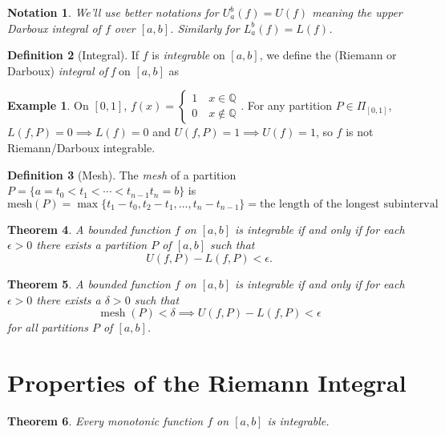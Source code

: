 \documentclass[12pt, lettersize]{book}
\theoremstyle{plain}
\newtheorem{thm}{Theorem}[section]
\newtheorem{nte}[thm]{Notation}
\theoremstyle{definition}
\newtheorem{dfn}[thm]{Definition}
\newtheorem*{eg}{Example}
\theoremstyle{remark}
\newcommand{\Q}{\mathbb{Q}}
\DeclareMathOperator{\mesh}{mesh}
\begin{document}
	\begin{nte}
		We'll use better notations for $U_a^b(f)=U(f)$ meaning the upper Darboux integral of $f$ over $[a,b]$. Similarly for $L_a^b(f)=L(f)$. 
	\end{nte}
	
	\begin{dfn}[Integral]
		If $f$ is \emph{integrable} on $[a,b]$, we define the (Riemann or Darboux) \emph{integral of f} on $[a,b]$ as 
	\end{dfn}
	\begin{eg}
		On $[0,1]$, $f(x)=\begin{cases}1\quad\text{$x\in\Q$}\\0\quad\text{$x\notin\Q$}\end{cases}$. For any partition $P\in\Pi_{[0,1]}$, $L(f,P)=0\implies L(f)=0$ and $U(f,P)=1\implies U(f)=1$, so $f$ is not Riemann/Darboux integrable. 
	\end{eg}
	
	\begin{dfn}[Mesh]
		The \emph{mesh} of a partition $P=\{a=t_0<t_1<\cdots<t_{n-1}t_n=b\}$ is
		\begin{displaymath}
			\text{mesh}(P)=\max\{t_1-t_0,t_2-t_1,\dots,t_n-t_{n-1}\}=\text{the length of the longest subinterval}
		\end{displaymath}
	\end{dfn}
	
	\begin{thm}
		A bounded function $f$ on $[a,b]$ is integrable if and only if for each $\epsilon>0$ there exists a partition $P$ of $[a,b]$ such that
		\begin{displaymath}
			U(f,P)-L(f,P)<\epsilon.
		\end{displaymath}
	\end{thm}
	
	\begin{thm}
		A bounded function $f$ on $[a,b]$ is integrable if and only if for each $\epsilon>0$ there exists a $\delta>0$ such that
		\begin{displaymath}
			\mesh(P)<\delta\implies U(f,P)-L(f,P)<\epsilon
		\end{displaymath}
		for all partitions $P$ of $[a,b]$.
	\end{thm}
	\newpage
	
	\section{Properties of the Riemann Integral}
	\begin{thm}
		Every monotonic function $f$ on $[a,b]$ is integrable.
	\end{thm}
\end{document}
